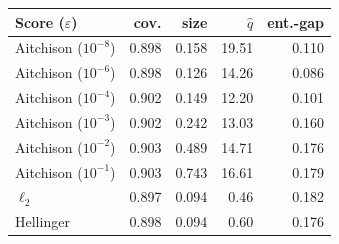 \begin{tabular}{lrrrr}
\toprule
Score ($\varepsilon$) & cov. & size & $\hat q$ & ent.-gap \\
\midrule
Aitchison ($10^{-8}$) & 0.898 & 0.158 & 19.51 & 0.110 \\
Aitchison ($10^{-6}$) & 0.898 & 0.126 & 14.26 & 0.086 \\
Aitchison ($10^{-4}$) & 0.902 & 0.149 & 12.20 & 0.101 \\
Aitchison ($10^{-3}$) & 0.902 & 0.242 & 13.03 & 0.160 \\
Aitchison ($10^{-2}$) & 0.903 & 0.489 & 14.71 & 0.176 \\
Aitchison ($10^{-1}$) & 0.903 & 0.743 & 16.61 & 0.179 \\
$\ell_2$ & 0.897 & 0.094 & 0.46 & 0.182 \\
Hellinger & 0.898 & 0.094 & 0.60 & 0.176 \\
\bottomrule
\end{tabular}